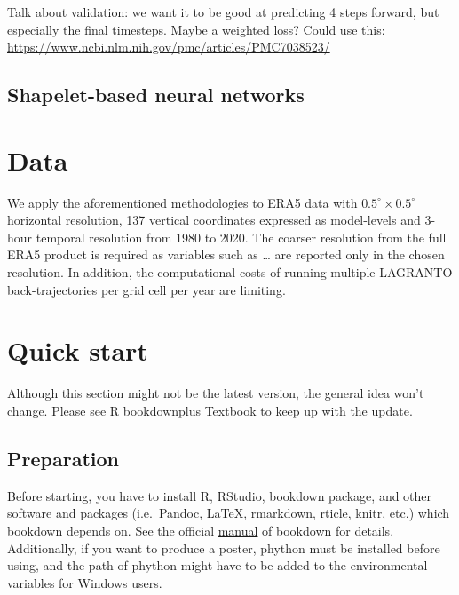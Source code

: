 \documentclass[11pt,a4paper,twoside,openright]{report}
\theoremstyle{definition}
\numberwithin{equation}{subsection}
\begin{document}
Talk about validation: we want it to be good at predicting 4 steps forward, but especially the final timesteps. Maybe a weighted loss? Could use this:
\url{https://www.ncbi.nlm.nih.gov/pmc/articles/PMC7038523/}

\hypertarget{shapelet-based-neural-networks}{%
\section{Shapelet-based neural networks}\label{shapelet-based-neural-networks}}

\hypertarget{data}{%
\chapter{Data}\label{data}}

We apply the aforementioned methodologies to ERA5 data with \(0.5^{\circ} \times 0.5^{\circ}\) horizontal resolution, 137 vertical coordinates expressed as model-levels and 3-hour temporal resolution from 1980 to 2020. The coarser resolution from the full ERA5 product is required as variables such as \ldots{} are reported only in the chosen resolution. In addition, the computational costs of running multiple LAGRANTO back-trajectories per grid cell per year are limiting.

\hypertarget{quick-start}{%
\chapter{Quick start}\label{quick-start}}

Although this section might not be the latest version, the general idea won't
change. Please see
\href{https://bookdown.org/baydap/bookdownplus}{R bookdownplus Textbook} to keep up
with the update.

\hypertarget{preparation}{%
\section{Preparation}\label{preparation}}

Before starting, you have to install R, RStudio, bookdown package, and
other software and packages (i.e.~Pandoc, LaTeX, rmarkdown, rticle,
knitr, etc.) which bookdown depends on. See the official
\href{https://bookdown.org/yihui/bookdown/}{manual} of bookdown for details.
Additionally, if you want to produce a poster, phython must be installed before
using, and the path of phython might have to be added to the environmental
variables for Windows users.
\end{document}
